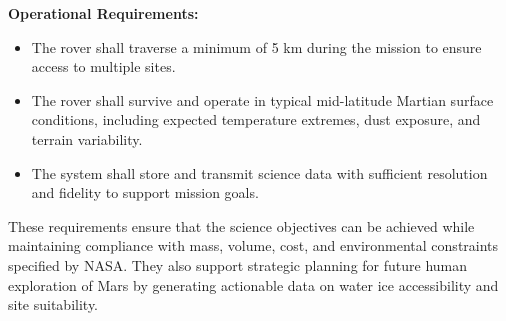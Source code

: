 \textbf{Operational Requirements:}
\begin{itemize}
    \item The rover shall traverse a minimum of 5 km during the mission to ensure access to multiple sites.
    \item The rover shall survive and operate in typical mid-latitude Martian surface conditions, including expected temperature extremes, dust exposure, and terrain variability.
    \item The system shall store and transmit science data with sufficient resolution and fidelity to support mission goals.
\end{itemize}

These requirements ensure that the science objectives can be achieved while maintaining compliance with mass, volume, cost, and environmental constraints specified by NASA. They also support strategic planning for future human exploration of Mars by generating actionable data on water ice accessibility and site suitability.

